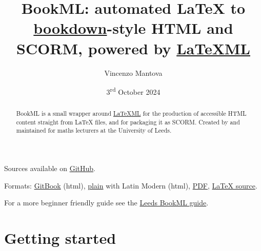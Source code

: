 \documentclass[a4paper,british]{article}
\title{BookML\@: automated LaTeX to \href{https://bookdown.org/yihui/bookdown/html.html\#gitbook-style}{bookdown}-style HTML and SCORM, powered by \href{https://dlmf.nist.gov/LaTeXML/}{LaTeXML}}
\author{Vincenzo Mantova}
\date{3\textsuperscript{rd} October 2024}
\begin{document}
\maketitle

\begin{abstract}
  BookML is a small wrapper around \href{https://dlmf.nist.gov/LaTeXML/}{LaTeXML} for the production of accessible HTML content straight from LaTeX files, and for packaging it as SCORM\@. Created by and maintained for maths lecturers at the University of Leeds.
\end{abstract}

\begin{center}
  Sources available on \href{https://github.com/vlmantova/bookml/}{GitHub}.

  Formats: \href{https://vlmantova.github.io/bookml/}{GitBook} (html), \href{https://vlmantova.github.io/bookml/index.plain.html}{plain} with Latin Modern (html), \href{https://vlmantova.github.io/bookml/docs.pdf}{PDF}, \href{https://github.com/vlmantova/bookml/blob/docs/docs.tex}{\LaTeX{} source}.

  For a more beginner friendly guide see the \href{https://vlmantova.github.io/bookmlleeds/}{Leeds BookML guide}.
\end{center}

\tableofcontents

\section{Getting started}
\end{document}
